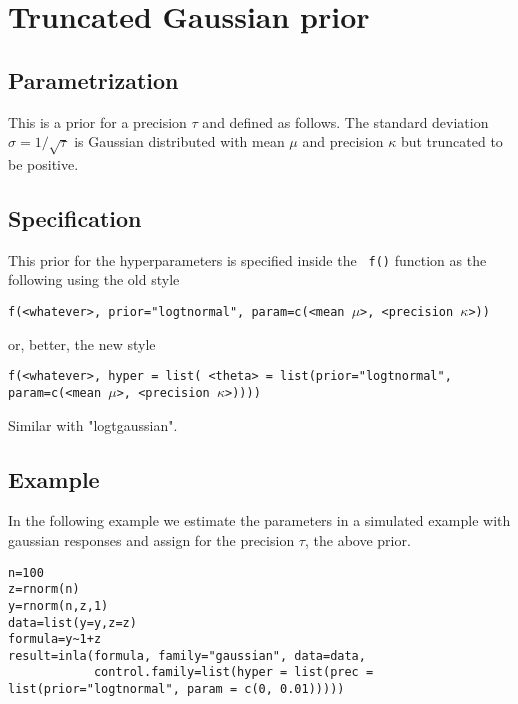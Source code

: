 \documentclass[a4paper,11pt]{article}
\begin{document}
\section*{Truncated Gaussian prior}

\subsection*{Parametrization}
This is a prior for a precision $\tau$ and defined as follows.  The
standard deviation $\sigma = 1/\sqrt{\tau}$ is Gaussian distributed
with mean $\mu$ and precision $\kappa$ but truncated to be positive.

\subsection*{Specification}
This prior for the hyperparameters is specified inside the {\tt
    f()} function as the following using the old style
\begin{center}
    {\tt f(<whatever>, prior="logtnormal", param=c(<mean $\mu$>, <precision $\kappa$>))}
\end{center}
or, better, the new style
\begin{center}
    {\tt f(<whatever>, hyper = list( <theta> = list(prior="logtnormal", param=c(<mean $\mu$>, <precision $\kappa$>))))}
\end{center}
Similar with "logtgaussian".

\subsection*{Example}

In the following example we estimate the parameters in a simulated
example with gaussian responses and assign for the precision
$\tau$, the above prior.
\begin{verbatim}
n=100
z=rnorm(n)
y=rnorm(n,z,1)
data=list(y=y,z=z)
formula=y~1+z
result=inla(formula, family="gaussian", data=data,
            control.family=list(hyper = list(prec = list(prior="logtnormal", param = c(0, 0.01)))))
\end{verbatim}
\end{document}
